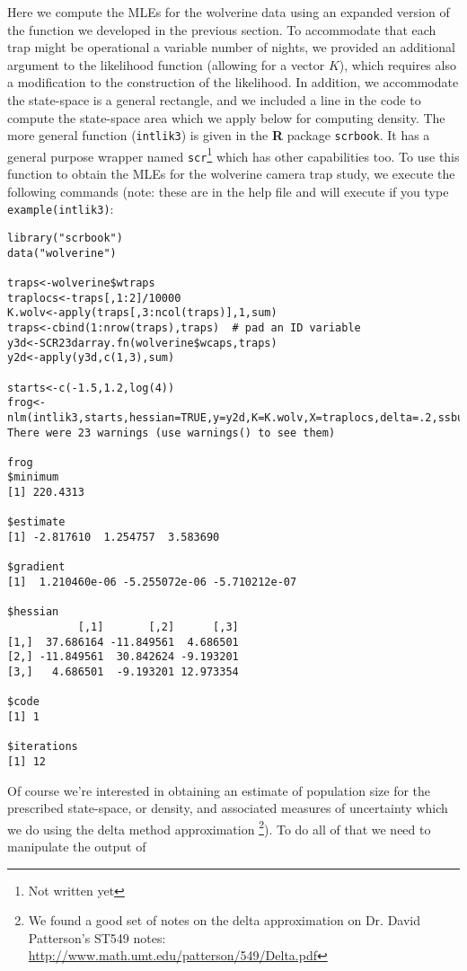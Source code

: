 Here we compute the MLEs for the wolverine data using an expanded
version of the function we developed in the previous section. To
accommodate that each trap might be operational a variable number of
nights, we provided an additional argument to the likelihood function
(allowing for a vector $K$), which requires also a modification to the
construction of the likelihood.  In addition,
we accommodate  the state-space is a general rectangle, and
we included a line in the code to compute the state-space area which
we apply below for computing density.  The more general function
(\mbox{\tt intlik3}) is given in the {\bf R} package \mbox{\tt scrbook}. It has a general
purpose wrapper named \mbox{\tt scr}\footnote{Not written yet} which has other capabilities too. 
To use this function to obtain the MLEs for the wolverine camera trap
study, we execute the following commands (note: these are in the help
file and will execute if you type \mbox{\tt example(intlik3)}:
{\small
\begin{verbatim}
library("scrbook")
data("wolverine")
 
traps<-wolverine$wtraps
traplocs<-traps[,1:2]/10000
K.wolv<-apply(traps[,3:ncol(traps)],1,sum)
traps<-cbind(1:nrow(traps),traps)  # pad an ID variable
y3d<-SCR23darray.fn(wolverine$wcaps,traps)
y2d<-apply(y3d,c(1,3),sum)

starts<-c(-1.5,1.2,log(4))
frog<-nlm(intlik3,starts,hessian=TRUE,y=y2d,K=K.wolv,X=traplocs,delta=.2,ssbuffer=2)
There were 23 warnings (use warnings() to see them)

frog
$minimum
[1] 220.4313

$estimate
[1] -2.817610  1.254757  3.583690

$gradient
[1]  1.210460e-06 -5.255072e-06 -5.710212e-07

$hessian
           [,1]       [,2]      [,3]
[1,]  37.686164 -11.849561  4.686501
[2,] -11.849561  30.842624 -9.193201
[3,]   4.686501  -9.193201 12.973354

$code
[1] 1

$iterations
[1] 12
\end{verbatim}
}
Of course we're interested in obtaining an estimate of population size
for the prescribed state-space, or density, and associated measures of
uncertainty which we do using the delta method approximation
\citep[][Appendix F4]{williams_etal:2002}
\footnote{
We found a good set of notes on the delta approximation on Dr. David
Patterson's ST549 notes: 
\url{http://www.math.umt.edu/patterson/549/Delta.pdf}
}).
To do all of that we need to manipulate the output of
